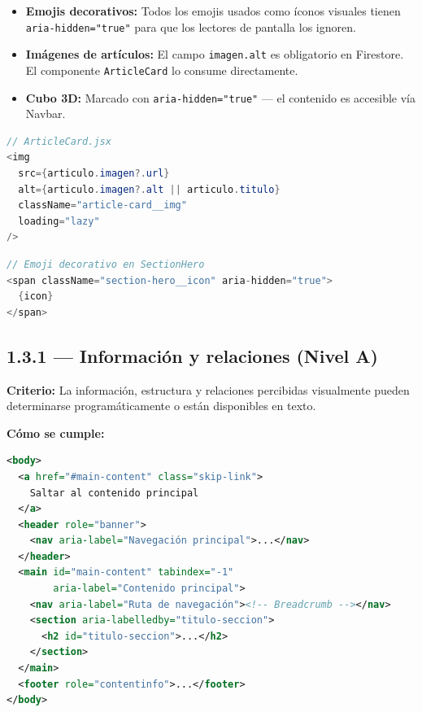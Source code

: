 \documentclass[12pt, a4paper]{article}
\begin{document}
\begin{itemize}
  \item \textbf{Emojis decorativos:} Todos los emojis usados como íconos visuales tienen \texttt{aria-hidden="true"} para que los lectores de pantalla los ignoren.
  \item \textbf{Imágenes de artículos:} El campo \texttt{imagen.alt} es obligatorio en Firestore. El componente \texttt{ArticleCard} lo consume directamente.
  \item \textbf{Cubo 3D:} Marcado con \texttt{aria-hidden="true"} --- el contenido es accesible vía Navbar.
\end{itemize}

\begin{evidbox}
\begin{lstlisting}[language=Java]
// ArticleCard.jsx
<img
  src={articulo.imagen?.url}
  alt={articulo.imagen?.alt || articulo.titulo}
  className="article-card__img"
  loading="lazy"
/>
\end{lstlisting}
\begin{lstlisting}[language=Java]
// Emoji decorativo en SectionHero
<span className="section-hero__icon" aria-hidden="true">
  {icon}
</span>
\end{lstlisting}
\end{evidbox}

\subsection{1.3.1 --- Información y relaciones (Nivel A)}

\textbf{Criterio:} La información, estructura y relaciones percibidas visualmente pueden determinarse programáticamente o están disponibles en texto.

\textbf{Cómo se cumple:}

\begin{evidbox}
\begin{lstlisting}[language=XML]
<body>
  <a href="#main-content" class="skip-link">
    Saltar al contenido principal
  </a>
  <header role="banner">
    <nav aria-label="Navegación principal">...</nav>
  </header>
  <main id="main-content" tabindex="-1"
        aria-label="Contenido principal">
    <nav aria-label="Ruta de navegación"><!-- Breadcrumb --></nav>
    <section aria-labelledby="titulo-seccion">
      <h2 id="titulo-seccion">...</h2>
    </section>
  </main>
  <footer role="contentinfo">...</footer>
</body>
\end{lstlisting}
\end{evidbox}
\end{document}
